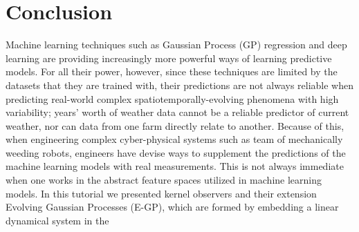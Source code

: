 \section{Conclusion}\label{sec:conclusion}
Machine learning techniques such as Gaussian Process (GP) regression and deep learning are providing increasingly more powerful ways of learning predictive models. For all their power, however, since these techniques are limited by the datasets that they are trained with, their predictions are not always reliable when predicting real-world complex spatiotemporally-evolving phenomena with high variability; years' worth of weather data cannot be a reliable predictor of current weather, nor can data from one farm directly relate to another. Because of this, when engineering complex cyber-physical systems such as team of mechanically weeding robots, engineers have devise ways to supplement the predictions of the machine learning models with real measurements. This is not always immediate when one works in the abstract feature spaces utilized in machine learning models. In this tutorial we presented kernel observers and their extension Evolving Gaussian Processes (E-GP), which are formed by embedding a linear dynamical system in the %
